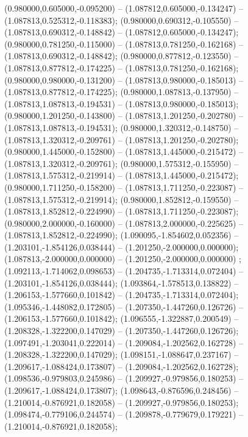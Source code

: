  (0.980000,0.605000,-0.095200) -- (1.087812,0.605000,-0.134247) -- (1.087813,0.525312,-0.118383);
 (0.980000,0.690312,-0.105550) -- (1.087813,0.690312,-0.148842) -- (1.087812,0.605000,-0.134247);
 (0.980000,0.781250,-0.115000) -- (1.087813,0.781250,-0.162168) -- (1.087813,0.690312,-0.148842);
 (0.980000,0.877812,-0.123550) -- (1.087813,0.877812,-0.174225) -- (1.087813,0.781250,-0.162168);
 (0.980000,0.980000,-0.131200) -- (1.087813,0.980000,-0.185013) -- (1.087813,0.877812,-0.174225);
 (0.980000,1.087813,-0.137950) -- (1.087813,1.087813,-0.194531) -- (1.087813,0.980000,-0.185013);
 (0.980000,1.201250,-0.143800) -- (1.087813,1.201250,-0.202780) -- (1.087813,1.087813,-0.194531);
 (0.980000,1.320312,-0.148750) -- (1.087813,1.320312,-0.209761) -- (1.087813,1.201250,-0.202780);
 (0.980000,1.445000,-0.152800) -- (1.087813,1.445000,-0.215472) -- (1.087813,1.320312,-0.209761);
 (0.980000,1.575312,-0.155950) -- (1.087813,1.575312,-0.219914) -- (1.087813,1.445000,-0.215472);
 (0.980000,1.711250,-0.158200) -- (1.087813,1.711250,-0.223087) -- (1.087813,1.575312,-0.219914);
 (0.980000,1.852812,-0.159550) -- (1.087813,1.852812,-0.224990) -- (1.087813,1.711250,-0.223087);
 (0.980000,2.000000,-0.160000) -- (1.087813,2.000000,-0.225625) -- (1.087813,1.852812,-0.224990);
 (1.090095,-1.854602,0.052356) -- (1.203101,-1.854126,0.038444) -- (1.201250,-2.000000,0.000000);
 (1.087813,-2.000000,0.000000) -- (1.201250,-2.000000,0.000000) ;
 (1.092113,-1.714062,0.098653) -- (1.204735,-1.713314,0.072404) -- (1.203101,-1.854126,0.038444);
 (1.093864,-1.578513,0.138822) -- (1.206153,-1.577660,0.101842) -- (1.204735,-1.713314,0.072404);
 (1.095346,-1.448082,0.172805) -- (1.207350,-1.447260,0.126726) -- (1.206153,-1.577660,0.101842);
 (1.096555,-1.322887,0.200549) -- (1.208328,-1.322200,0.147029) -- (1.207350,-1.447260,0.126726);
 (1.097491,-1.203041,0.222014) -- (1.209084,-1.202562,0.162728) -- (1.208328,-1.322200,0.147029);
 (1.098151,-1.088647,0.237167) -- (1.209617,-1.088424,0.173807) -- (1.209084,-1.202562,0.162728);
 (1.098536,-0.979803,0.245986) -- (1.209927,-0.979856,0.180253) -- (1.209617,-1.088424,0.173807);
 (1.098643,-0.876596,0.248456) -- (1.210014,-0.876921,0.182058) -- (1.209927,-0.979856,0.180253);
 (1.098474,-0.779106,0.244574) -- (1.209878,-0.779679,0.179221) -- (1.210014,-0.876921,0.182058);
